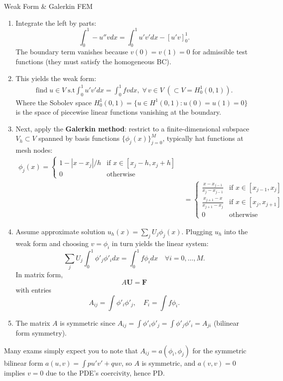 \documentclass[a4paper,11pt]{report}
\begin{document}
\begin{outline}{Weak Form \& Galerkin FEM}{}
\begin{enumerate}
        \item Integrate the left by parts:
              $$\int_0^1 -u'' vdx = \int_0^1 u' v'dx - [u'v]_0^1.$$
              The boundary term vanishes because $v(0)=v(1)=0$ for admissible test functions (they must satisfy the homogeneous BC).
        \item This yields the weak form:
              \begin{align*}
                  \text{find} \; u \in V \;  \text{s.t} \int_0^1 u' v'dx = \int_0^1 f vdx, \; \forall \, v\in V \; (\subset V=H^1_0(0,1)).
              \end{align*}
              Where the Sobolev space $H^1_0(0,1) = \{u \in H^1(0,1) : u(0)=u(1)=0\}$ is the space of piecewise linear functions vanishing at the boundary.
        \item Next, apply the \textbf{Galerkin method}: restrict to a finite-dimensional subspace $V_h \subset V$ spanned by basis functions $\{\phi_j(x)\}_{j=0}^M$, typically hat functions at mesh nodes:
              \begin{align*}
                  \phi_j(x) = \begin{cases}
                                  1 - |x-x_j|/h & \text{if } x \in [x_j-h,x_j+h] \\
                                  0             & \text{otherwise}
                              \end{cases} \\
                   & =
                  \begin{cases}
                      \frac{x-x_{j-1}}{x_j-x_{j-1}} & \text{if } x \in [x_{j-1},x_j] \\
                      \frac{x_{j+1}-x}{x_{j+1}-x_j} & \text{if } x \in [x_j,x_{j+1}] \\
                      0                             & \text{otherwise}
                  \end{cases}
                  \tag{(hat function)}
              \end{align*}
        \item Assume approximate solution $u_h(x)=\sum_{j} U_j \phi_j(x).$
              Plugging $u_h$ into the weak form and choosing $v=\phi_i$ in turn yields the linear system:
              $$\sum_j U_j \int_0^1 \phi'_j \phi'_idx = \int_0^1 f\phi_idx \quad \forall i=0,\ldots,M.$$
              In matrix form,
              $$A\mathbf{U} = \mathbf{F}$$
              with entries
              $$A_{ij}=\int \phi'_i \phi'_j, \quad F_i=\int f\phi_i.$$
        \item The matrix $A$ is symmetric since $A_{ij} = \int \phi'_i \phi'_j = \int \phi'_j \phi'_i = A_{ji}$ (bilinear form symmetry).
    \end{enumerate}
\end{outline}
Many exams simply expect you to note that $A_{ij}=a(\phi_i,\phi_j)$ for the symmetric bilinear form $a(u,v)=\int pu'v' + quv$, so $A$ is symmetric, and $a(v,v)=0$ implies $v=0$ due to the PDE's coercivity, hence PD.
\end{document}
